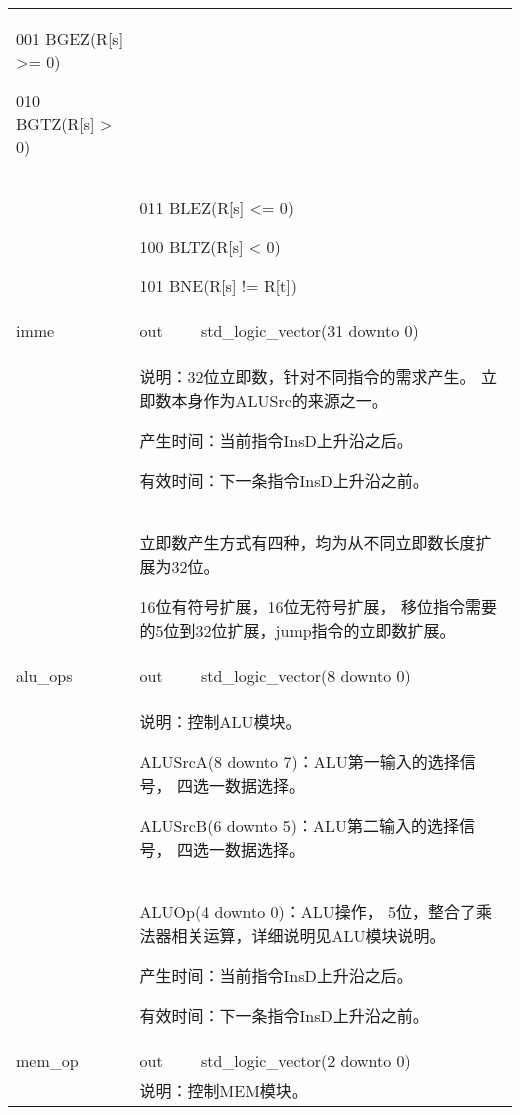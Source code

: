 \begin{tabularx}{\textwidth}{lll}
{                001 BGEZ(R[s] >= 0)

                010 BGTZ(R[s] > 0)
            } \\
            &
            \multicolumn{2}{X}{
                011 BLEZ(R[s] <= 0)

                100 BLTZ(R[s] < 0)

                101 BNE(R[s] != R[t])
            } \\
            \midrule
            imme            & out       & std\_logic\_vector(31 downto 0) \\
            \cmidrule(l){2-3}
            &
            \multicolumn{2}{X}{
                说明：32位立即数，针对不同指令的需求产生。%
                立即数本身作为ALUSrc的来源之一。

                产生时间：当前指令InsD上升沿之后。

                有效时间：下一条指令InsD上升沿之前。 
            } \\
            &
            \multicolumn{2}{X}{
                立即数产生方式有四种，均为从不同立即数长度扩展为32位。

                16位有符号扩展，16位无符号扩展，%
                移位指令需要的5位到32位扩展，jump指令的立即数扩展。
            } \\
            \midrule
            alu\_ops        & out       & std\_logic\_vector(8 downto 0) \\
            \cmidrule(l){2-3}
            &
            \multicolumn{2}{X}{
                说明：控制ALU模块。

                ALUSrcA(8 downto 7)：ALU第一输入的选择信号，%
                四选一数据选择。

                ALUSrcB(6 downto 5)：ALU第二输入的选择信号，%
                四选一数据选择。
            } \\
            &
            \multicolumn{2}{X}{
                ALUOp(4 downto 0)：ALU操作，%
                5位，整合了乘法器相关运算，详细说明见ALU模块说明。

                产生时间：当前指令InsD上升沿之后。

                有效时间：下一条指令InsD上升沿之前。 
            } \\
            \midrule
            mem\_op         & out       & std\_logic\_vector(2 downto 0) \\
            \cmidrule(l){2-3}
            &
            \multicolumn{2}{X}{
                说明：控制MEM模块。

}
\end{tabularx}
